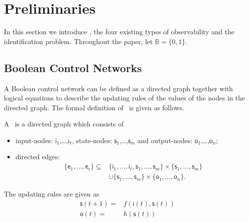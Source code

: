 
\section{Preliminaries} 
\label{sec:pre}
In this section we introduce {\BCNs}, the four existing types of observability and the identification problem. Throughout the paper,  let $\mathbb{B}=\{0,1\}$.

\subsection{Boolean Control Networks}

A Boolean control network can be defined as a directed graph together with logical equations to describe the updating rules of the values of the nodes in  the directed graph. The formal definition of \BCN\ is given as follows. 

\begin{definition} A \BCN\
	is a directed graph which consists of 
	\begin{itemize}
	\item input-nodes: {$\mathsf{i}_1$,\ldots ,$\mathsf{i}_{\ell}$}, state-nodes: {$\mathsf{s}_1$,\ldots ,$\mathsf{s}_m$} and output-nodes: {$\mathsf{o}_1$,\ldots ,$\mathsf{o}_n$};
	\item  directed edges: 
		\begin{equation*}
			\begin{split}
				\{\mathsf{e}_1,\ldots,\mathsf{e}_{\epsilon}\}\subseteq & \{\mathsf{i}_1,\ldots ,\mathsf{i}_{\ell},\mathsf{s}_1,\ldots ,\mathsf{s}_m\}\times \{\mathsf{s}_1,\ldots ,\mathsf{s}_m\} \\
				&\cup \{\mathsf{s}_1,\ldots ,\mathsf{s}_m\}\times\{\mathsf{o}_1,\ldots ,\mathsf{o}_n\}. 
			\end{split}
		\end{equation*}
	
\end{itemize}	
The updating rules are given as
\begin{equation}
\begin{split}
\mathsf{s}(t+1)=&f(\mathsf{i}(t),\mathsf{s}(t))\\
\mathsf{o}(t)=&h(\mathsf{s}(t))
\end{split}
\label{equ:1}
\end{equation}
 \end{definition}

